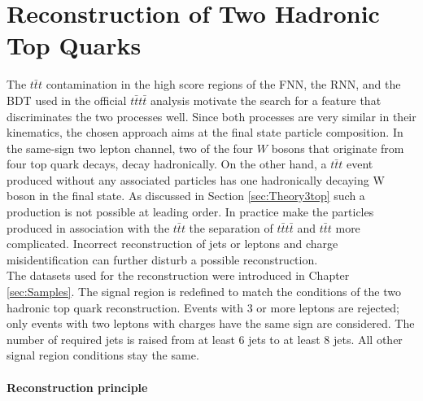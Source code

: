 \newpage

\section{Reconstruction of Two Hadronic Top Quarks}
\label{sec:TwoHadTop}

The $t\bar{t}t$ contamination in the high score regions of the FNN, the RNN, and the BDT used in the official $t\bar{t}t\bar{t}$ analysis motivate the search for a feature that discriminates the two processes well. Since both processes are very similar in their kinematics, the chosen approach aims at the final state particle composition. In the same-sign two lepton channel, two of the four $W$ bosons that originate from four top quark decays, decay
hadronically. On the other hand, a $t\bar{t}t$ event produced without any associated particles has one hadronically decaying W boson in the final state. As discussed in Section \ref{sec:Theory3top} such a production is not possible at leading order. In practice make the particles produced in association with the $t\bar{t}t$ the separation of $t\bar{t}t\bar{t}$ and $t\bar{t}t$ more complicated. Incorrect reconstruction of jets or leptons and charge misidentification can further disturb a possible reconstruction. \\
The datasets used for the reconstruction were introduced in Chapter \ref{sec:Samples}. The signal region is redefined to match the conditions of the two hadronic top quark reconstruction. Events with 3 or more leptons are rejected; only events with two leptons with charges have the same sign are considered. The number of required jets is raised from at least 6 jets to at least 8 jets. All other signal region conditions stay the same.

\paragraph{Reconstruction principle} \mbox{} \\


